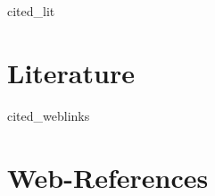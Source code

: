 \thispagestyle{empty}



\begin{btSect}[plain]{cited_lit}
\section*{Literature}
\setlength{\bibhang}{2em}
\btPrintCited
\end{btSect}

\nocite{*} 
\begin{btSect}[plain]{cited_weblinks}
\section*{Web-References}
\setlength{\bibhang}{2em}
\btPrintCited
\end{btSect}
